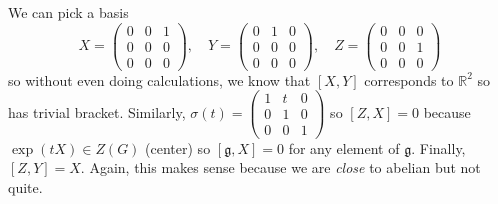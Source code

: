 \documentclass[12pt]{article}
\newcommand{\R}{\mathbb{R}}
\newcommand{\g}{\mathfrak{g}}
\begin{document}
\begin{itemize}
        We can pick a basis 
        \[X = \begin{pmatrix}
            0 & 0 & 1\\ 
            0 & 0 & 0\\ 
            0 & 0 & 0
        \end{pmatrix}, \quad Y = \begin{pmatrix}
            0 & 1 & 0\\ 
            0 & 0 & 0\\ 
            0 & 0 & 0
        \end{pmatrix}, \quad Z = \begin{pmatrix}
            0 & 0 & 0\\ 
            0 & 0 & 1\\ 
            0 & 0 & 0
        \end{pmatrix}\] 
        so without even doing calculations, we know that $[X, Y]$ corresponds to $\R^2$ so has trivial bracket. Similarly, $\sigma(t) = \begin{pmatrix}
            1 & t & 0\\ 
            0 & 1 & 0\\
            0 & 0 & 1
        \end{pmatrix}$ so $[Z, X] = 0$ because $\exp(tX) \in Z(G)$ (center) so $[\g, X] = 0$ for any element of $\g$. Finally, $[Z, Y] = X$. Again, this makes sense because we are \emph{close} to abelian but not quite. 


\end{itemize}
\end{document}
